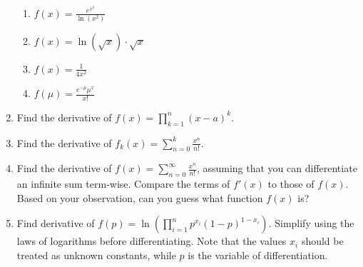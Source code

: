 \documentclass{article}
\begin{document}
\begin{enumerate}
\begin{enumerate}
                    \item $\displaystyle f(x) = \frac{e^{x^2}}{\ln(x^2)}$
                    \item $\displaystyle f(x) = \ln(\sqrt{x})\cdot \sqrt{x}$
                    \item $\displaystyle f(x) = \frac{1}{4x^2}$
                    \item $\displaystyle f(\mu) = \frac{e^{-\mu}\mu^x}{x!}$
                \end{enumerate}
                \item Find the derivative of $\displaystyle f(x)=\prod_{k=1}^n (x-a)^k$. 
                \item Find the derivative of $\displaystyle f_k(x) = \sum_{n=0}^k \frac{x^n}{n!}$.
                \item Find the derivative of $\displaystyle f(x) = \sum_{n=0}^\infty \frac{x^n}{n!}$, assuming that you can differentiate an infinite sum term-wise. Compare the terms of $f'(x)$ to those of $f(x)$. Based on your observation, can you guess what function $f(x)$ is?
                \item Find derivative of $\displaystyle f(p) = \ln{\left(\prod_{i=1}^n p^{x_i}(1-p)^{1-x_i}\right)}$. Simplify using the laws of logarithms before differentiating. Note that the values $x_i$ should be treated as unknown constants, while $p$ is the variable of differentiation.
          
                
           
                \end{enumerate}
\end{document}
